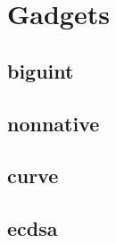 \section{Gadgets} \label{sec:gadgets}


\subsection{biguint}





\subsection{nonnative}




\subsection{curve}


  


\subsection{ecdsa}
